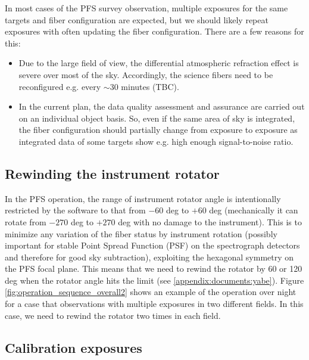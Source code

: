 \documentclass[a4paper]{article}
\begin{document}
In most cases of the PFS survey observation, multiple exposures for
the same targets and fiber configuration are expected, but we should
likely repeat exposures with often updating the fiber configuration.
There are a few reasons for this:

\begin{itemize}
\item Due to the large field of view, the differential atmospheric
  refraction effect is severe over most of the sky. Accordingly, the
  science fibers need to be reconfigured e.g. every $\sim$30 minutes
  (TBC).
\item In the current plan, the data quality assessment and assurance
  are carried out on an individual object basis. So, even if the same
  area of sky is integrated, the fiber configuration should partially
  change from exposure to exposure as integrated data of some targets
  show e.g. high enough signal-to-noise ratio.
\end{itemize}

\subsection{Rewinding the instrument rotator}

In the PFS operation, the range of instrument rotator angle is
intentionally restricted by the software to that from $-60$ deg to
$+60$ deg (mechanically it can rotate from $-270$ deg to $+270$ deg
with no damage to the instrument). This is to minimize any variation
of the fiber status by instrument rotation (possibly important for
stable Point Spread Function (PSF) on the spectrograph detectors and
therefore for good sky subtraction), exploiting the hexagonal symmetry
on the PFS focal plane. This means that we need to rewind the rotator
by 60 or 120 deg when the rotator angle hits the limit (see
\ref{appendix:documents:yabe}). Figure
\ref{fig:operation_sequence_overall2} shows an example of the
operation over night for a case that observations with multiple
exposures in two different fields. In this case, we need to rewind the
rotator two times in each field.

\subsection{Calibration exposures}
\end{document}
